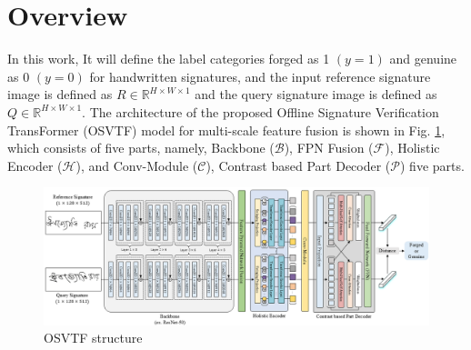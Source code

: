 \section{Overview}

In this work, It will define the label categories forged as 1 $(y=1)$ and genuine as 0 $(y=0)$ for handwritten signatures, and the input reference signature image is defined as $R \in \mathbb{R}^{H\times W\times 1}$ and the query signature image is defined as $Q \in \mathbb{R}^{H\times W\times 1}$. The architecture of the proposed Offline Signature Verification TransFormer (OSVTF) model for multi-scale feature fusion is shown in Fig. \ref{fig:osvtf}, which consists of five parts, namely, Backbone ($\mathcal{B}$), FPN Fusion ($\mathcal{F}$), Holistic Encoder ($\mathcal{H}$), and Conv-Module ($\mathcal{C}$), Contrast based Part Decoder ($\mathcal{P}$) five parts.

\begin{figure}[htbp]
  \begin{center}
      \includegraphics[scale=0.46]{figure/osvtf.png}
  \end{center}
  \caption{OSVTF structure}
  \label{fig:osvtf}
\end{figure}


